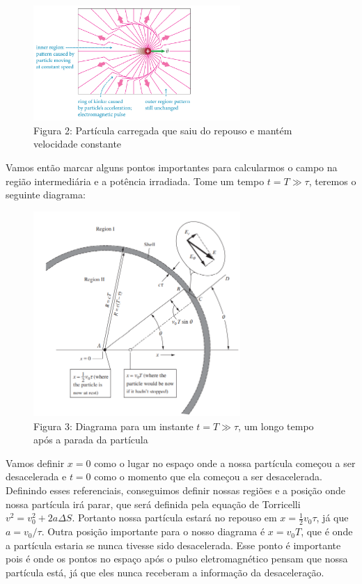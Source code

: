 \documentclass[12pt, letterpaper]{article}
\begin{document}
    \begin{figure}[h]
        \centering
        \includegraphics[width=0.7\textwidth]{pulse}
        \\{Figura 2: Partícula carregada que saiu do repouso e mantém velocidade constante}
        \label{fig:fig2}
    \end{figure}

    Vamos então marcar alguns pontos importantes para calcularmos o campo na região intermediária e a potência irradiada. Tome um tempo $t = T \gg \tau$, teremos o seguinte diagrama:

    \begin{figure}[h]
        \centering
        \includegraphics[width=0.7\textwidth]{diagrama}
        \\{Figura 3: Diagrama para um instante $t = T \gg \tau$, um longo tempo após a parada da partícula}
        \label{fig:fig3}
    \end{figure}

    Vamos definir $x = 0$ como o lugar no espaço onde a nossa partícula começou a ser desacelerada e $t = 0$ como o momento que ela começou a ser desacelerada. Definindo esses referenciais, conseguimos definir nossas regiões e a posição onde nossa partícula irá parar, que será definida pela equação de Torricelli $v^2 = v_0 ^2 + 2a\Delta S$. Portanto nossa partícula estará no repouso em $x = \frac{1}{2} v_0 \tau$, já que $a = v_0 /\tau$. Outra posição importante para o nosso diagrama é $x = v_0 T$, que é onde a partícula estaria se nunca tivesse sido desacelerada. Esse ponto é importante pois é onde os pontos no espaço após o pulso eletromagnético pensam que nossa partícula está, já que eles nunca receberam a informação da desaceleração.
\end{document}
